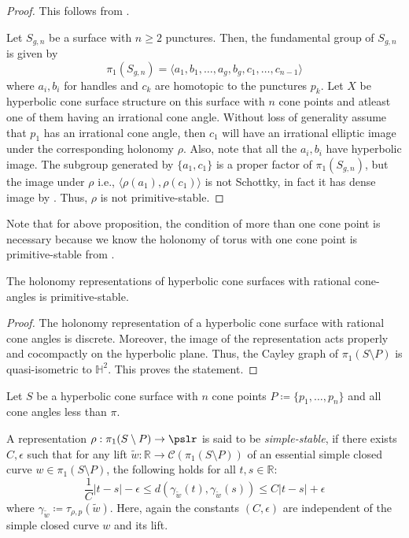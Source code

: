\begin{proof} 
	This follows from \cite[Lemma 3.2]{Minsky}. 
	
	Let $S_{g,n}$ be a surface with $n \geq 2$ punctures. Then, the fundamental group of $S_{g,n}$ is given by \[\pi_1(S_{g,n}) = \langle a_1, b_1,\ldots,a_g,b_g,c_1,\ldots,c_{n-1} \rangle\]
	where $a_i,b_i$ for handles and $c_k$ are homotopic to the punctures $p_k$. Let $X$ be hyperbolic cone surface structure on this surface with $n$ cone points and atleast one of them having an irrational cone angle. Without loss of generality assume that $p_1$ has an irrational cone angle, then $c_1$ will have an irrational elliptic image under the corresponding holonomy $\rho$. Also, note that all the $a_i, b_i$ have hyperbolic image. The subgroup generated by $\{a_1,c_1\}$ is a proper factor of $\pi_1(S_{g,n})$, but the image under $\rho$ i.e., $\langle \rho(a_1), \rho(c_1) \rangle$ is not Schottky, in fact it has dense image by \cite[Lemma 2.24]{MahanKoberdaKim}. Thus, $\rho$ is not primitive-stable.
\end{proof}

Note that for above proposition, the condition of more than one cone point is necessary because we know the holonomy of torus with one cone point is primitive-stable from \cite{LupiThesis}.

\begin{theorem}
	The holonomy representations of hyperbolic cone surfaces with rational cone-angles is primitive-stable.
\end{theorem}

\begin{proof}
	The holonomy representation of a hyperbolic cone surface with rational cone angles is discrete. Moreover, the image of the representation acts properly and cocompactly on the hyperbolic plane. Thus, the Cayley graph of $\pi_1(S \setminus P)$ is quasi-isometric to $\mathbb{H}^2$. This proves the statement. 
\end{proof}


Let $S$ be a hyperbolic cone surface with $n$ cone points $P \coloneqq \{p_1,\ldots,p_n\}$ and all cone angles less than $\pi$. 

\begin{defn}
	A representation $\rho:\pi_1(S \setminus P) \rightarrow \pslr$ is said to be \textit{simple-stable}, if there exists $C,\epsilon$ such that for any lift $\tilde{w}: \mathbb{R} \rightarrow \mathcal{C}(\pi_1(S \setminus P))$ of an essential simple closed curve $w \in \pi_1(S \setminus P)$, the following holds for all $t,s \in \mathbb{R}$:
	\[\dfrac{1}{C}|t-s| - \epsilon \leq d(\gamma_{\tilde{w}}(t),\gamma_{\tilde{w}}(s)) \leq C|t-s|+ \epsilon\] 
	where $\gamma_{\tilde{w}} \coloneqq \tau_{\rho,p}(\tilde{w})$. Here, again the constants $(C, \epsilon)$ are independent of the simple closed curve $w$ and its lift.
\end{defn}

